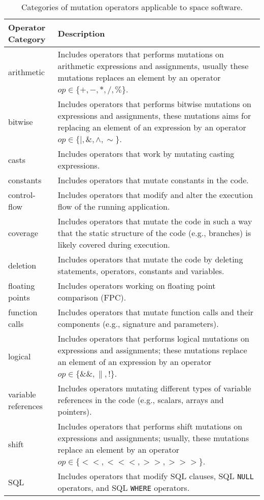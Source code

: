 
\begin{table}
\scriptsize
\centering
\label{table:codeoperatorssummary}
\caption{Categories of mutation operators applicable to space software.}
\begin{tabular}{p{1.8cm}|p{5.4cm}}
\toprule
Operator Category & Description\\
\midrule
arithmetic & Includes operators that performs mutations on arithmetic expressions and assignments, usually these mutations replaces an element by an operator $op \in \{+, -, *, /, \%\}$. \\
bitwise & Includes operators that performs bitwise mutations on expressions and assignments, these mutations aims for replacing an element of an expression by an operator $op \in \{|, \&, \wedge, \sim\}$. \\
casts & Includes operators that work by mutating casting expressions.\\
constants & Includes operators that mutate constants in the code. \\
control-flow & Includes operators that modify and alter the execution flow of the running application.\\
coverage & Includes operators that mutate the code in such a way that the static structure of the code (e.g., branches) is likely covered during execution.\\
deletion & Includes operators that mutate the code by deleting statements, operators, constants and variables.  \\
floating points & Includes operators working on floating point comparison (FPC).\\
function calls & Includes operators that mutate function calls and their components (e.g., signature and parameters).\\
logical & Includes operators that performs logical mutations on expressions and assignments; these mutations replace an element of an expression by an operator $op \in \{\&\&, \|, !\}$.\\
variable references & Includes operators mutating different types of variable references in the code (e.g., scalars, arrays and pointers).\\
shift & Includes operators that performs shift mutations on expressions and assignments; usually, these mutations replace an element by an operator $op \in \{<<, <<<, >>, >>>\}$.\\
SQL & Includes operators that modify SQL clauses, SQL \texttt{NULL} operators, and SQL \texttt{WHERE} operators.\\

\end{tabular}
\end{table}
